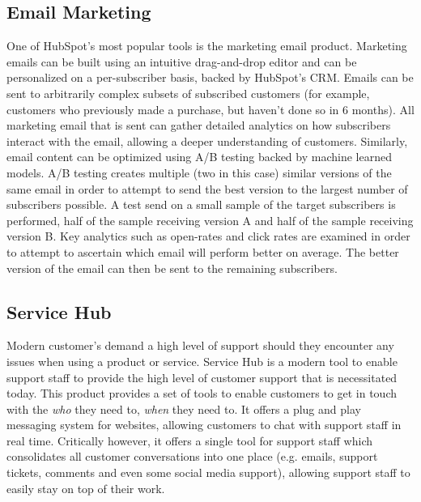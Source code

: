 \subsection{Email Marketing}
One of HubSpot's most popular tools is the marketing email product. Marketing emails can be built using an intuitive drag-and-drop editor and can be personalized on a per-subscriber basis, backed by HubSpot's CRM. Emails can be sent to arbitrarily complex subsets of subscribed customers (for example, customers who previously made a purchase, but haven't done so in 6 months). All marketing email that is sent can gather detailed analytics on how subscribers interact with the email, allowing a deeper understanding of customers. Similarly, email content can be optimized using A/B testing backed by machine learned models. A/B testing creates multiple (two in this case) similar versions of the same email in order to attempt to send the best version to the largest number of subscribers possible. A test send on a small sample of the target subscribers is performed, half of the sample receiving version A and half of the sample receiving version B. Key analytics such as open-rates and click rates are examined in order to attempt to ascertain which email will perform better on average. The better version of the email can then be sent to the remaining subscribers.

\subsection{Service Hub}
Modern customer's demand a high level of support should they encounter any issues when using a product or service. Service Hub is a modern tool to enable support staff to provide the high level of customer support that is necessitated today. This product provides a set of tools to enable customers to get in touch with the \textit{who} they need to, \textit{when} they need to. It offers a plug and play messaging system for websites, allowing customers to chat with support staff in real time. Critically however, it offers a single tool for support staff which consolidates all customer conversations into one place (e.g. emails, support tickets, comments and even some social media support), allowing support staff to easily stay on top of their work. 


